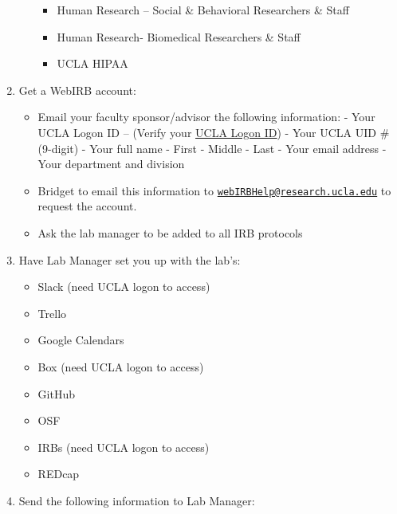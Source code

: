 \documentclass[
]{book}
\providecommand{\tightlist}{%
  \setlength{\itemsep}{0pt}\setlength{\parskip}{0pt}}
\begin{document}
\begin{enumerate}
\begin{itemize}
    \begin{itemize}
    \tightlist
    \item
      Human Research -- Social \& Behavioral Researchers \& Staff
    \item
      Human Research- Biomedical Researchers \& Staff
    \item
      UCLA HIPAA
    \end{itemize}
  \end{itemize}
\item
  Get a WebIRB account:

  \begin{itemize}
  \tightlist
  \item
    Email your faculty sponsor/advisor the following information:
    - Your UCLA Logon ID -- (Verify your \href{https://accounts.iam.ucla.edu/lookup}{UCLA Logon ID})
    - Your UCLA UID \# (9-digit)
    - Your full name
    - First
    - Middle
    - Last
    - Your email address
    - Your department and division
  \item
    Bridget to email this information to \href{mailto:webIRBHelp@research.ucla.edu}{\nolinkurl{webIRBHelp@research.ucla.edu}} to request the account.
  \item
    Ask the lab manager to be added to all IRB protocols
  \end{itemize}
\item
  Have Lab Manager set you up with the lab's:

  \begin{itemize}
  \tightlist
  \item
    Slack (need UCLA logon to access)
  \item
    Trello
  \item
    Google Calendars
  \item
    Box (need UCLA logon to access)
  \item
    GitHub
  \item
    OSF
  \item
    IRBs (need UCLA logon to access)
  \item
    REDcap
  \end{itemize}
\item
  Send the following information to Lab Manager:


\end{enumerate}
\end{document}
